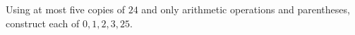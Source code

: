 Using at most five copies of $24$ and only arithmetic operations and parentheses, construct each of $0,1,2,3,25$.
